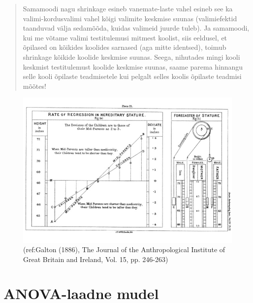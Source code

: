 \documentclass[]{book}
\begin{document}
\begin{quote}
Samamoodi nagu shrinkage esineb vanemate-laste vahel esineb see ka valimi-kordusvalimi vahel kõigi valimite keskmise suunas (valimiefektid taanduvad välja sedamõõda, kuidas valimeid juurde tuleb). Ja samamoodi, kui me võtame valimi testitulemusi mitmest koolist, siis eeldusel, et õpilased on kõikides koolides sarnased (aga mitte identsed), toimub shrinkage kõikide koolide keskmise suunas. Seega, nihutades mingi kooli keskmist testitulemust koolide keskmise suunas, saame parema hinnangu selle kooli õpilaste teadmisetele kui pelgalt selles koolis õpilaste teadmisi mõõtes!
\end{quote}

\begin{figure}
\includegraphics[width=1.5\linewidth]{img/galton} \caption{(ref:Galton (1886), The Journal of the Anthropological Institute of Great Britain and Ireland, Vol. 15, pp. 246-263)}\label{fig:parun}
\end{figure}

\hypertarget{anova-laadne-mudel}{%
\section{ANOVA-laadne mudel}\label{anova-laadne-mudel}}
\end{document}
